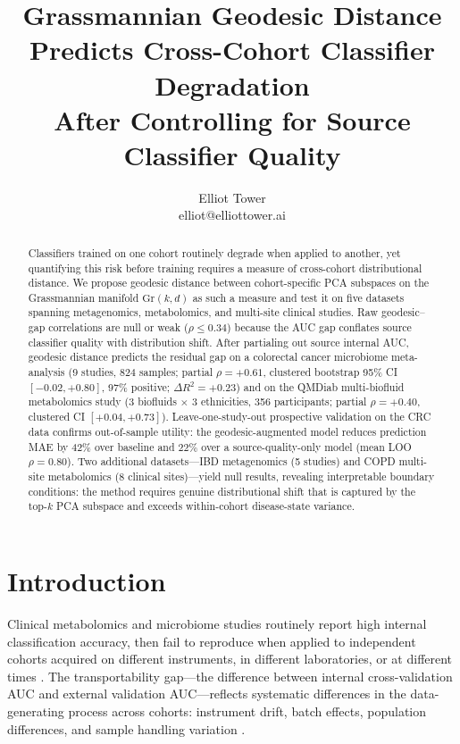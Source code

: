 \documentclass{article}
\title{Grassmannian Geodesic Distance Predicts Cross-Cohort Classifier Degradation\\After Controlling for Source Classifier Quality}
\author{\name Elliot Tower \\
      \email elliot@elliottower.ai}
\begin{document}
\maketitle

\begin{abstract}
Classifiers trained on one cohort routinely degrade when applied to another, yet quantifying this risk before training requires a measure of cross-cohort distributional distance. We propose geodesic distance between cohort-specific PCA subspaces on the Grassmannian manifold $\mathrm{Gr}(k, d)$ as such a measure and test it on five datasets spanning metagenomics, metabolomics, and multi-site clinical studies. Raw geodesic--gap correlations are null or weak ($\rho \leq 0.34$) because the AUC gap conflates source classifier quality with distribution shift. After partialing out source internal AUC, geodesic distance predicts the residual gap on a colorectal cancer microbiome meta-analysis (9 studies, 824 samples; partial $\rho = +0.61$, clustered bootstrap 95\% CI $[-0.02, +0.80]$, 97\% positive; $\Delta R^2 = +0.23$) and on the QMDiab multi-biofluid metabolomics study (3 biofluids $\times$ 3 ethnicities, 356 participants; partial $\rho = +0.40$, clustered CI $[+0.04, +0.73]$). Leave-one-study-out prospective validation on the CRC data confirms out-of-sample utility: the geodesic-augmented model reduces prediction MAE by 42\% over baseline and 22\% over a source-quality-only model (mean LOO $\rho = 0.80$). Two additional datasets---IBD metagenomics (5 studies) and COPD multi-site metabolomics (8 clinical sites)---yield null results, revealing interpretable boundary conditions: the method requires genuine distributional shift that is captured by the top-$k$ PCA subspace and exceeds within-cohort disease-state variance.
\end{abstract}

\section{Introduction}

Clinical metabolomics and microbiome studies routinely report high internal classification accuracy, then fail to reproduce when applied to independent cohorts acquired on different instruments, in different laboratories, or at different times \citep{broadhurst2006statistical}. The transportability gap---the difference between internal cross-validation AUC and external validation AUC---reflects systematic differences in the data-generating process across cohorts: instrument drift, batch effects, population differences, and sample handling variation \citep{wehrens2016improved}.
\end{document}
